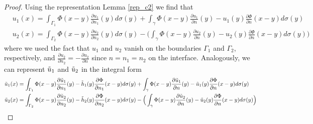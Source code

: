 \begin{proof}
    Using the representation Lemma \ref{rep_c2} we find that
    \begin{align*}
        &u_1(x) = \int_{\Gamma_1} \Phi(x-y)\frac{\partial u_1}{\partial n_1}(y) d\sigma(y)+\int_{\gamma} \Phi(x-y)\frac{\partial u_1}{\partial n}(y) - u_1(y) \frac{\partial \Phi}{\partial n}(x-y) d\sigma(y)\\
        &u_2(x) = \int_{\Gamma_2} \Phi(x-y)\frac{\partial u_2}{\partial n_2}(y) d\sigma(y)-\Big(\int_{\gamma} \Phi(x-y)\frac{\partial u_2}{\partial n}(y) - u_2(y) \frac{\partial \Phi}{\partial n}(x-y) d\sigma(y)\Big)
    \end{align*}
    where we used the fact that \(u_1\) and \(u_2\) vanish on the boundaries \(\Gamma_1\) and \(\Gamma_2\), respectively, and \(\frac{\partial u_2}{\partial n_2} = -\frac{\partial u_2}{\partial n}\) since \(n = n_1 = n_2\) on the interface.
    Analogously, we can represent \(\Tilde{u}_1\) and \(\Tilde{u}_2\) in the integral form
    \begin{align*}
        &\Tilde{u}_1(x) =  \int_{\Gamma_1} \Phi(x-y)\frac{\partial \Tilde{u}_1}{\partial n_1}(y) - \Tilde{h}_1(y) \frac{\partial \Phi}{\partial n_1}(x-y) d\sigma(y) + \int_{\gamma} \Phi(x-y)\frac{\partial \Tilde{u}_1}{\partial n}(y) - \Tilde{u}_1(y) \frac{\partial \Phi}{\partial n}(x-y) d\sigma(y)\\
        &\Tilde{u}_2(x) = \int_{\Gamma_2} \Phi(x-y)\frac{\partial \Tilde{u}_2}{\partial n_2}(y) - \Tilde{h}_2(y) \frac{\partial \Phi}{\partial n_2}(x-y) d\sigma(y) -\Big(\int_{\gamma} \Phi(x-y)\frac{\partial \Tilde{u}_2}{\partial n}(y) - \Tilde{u}_2(y) \frac{\partial \Phi}{\partial n}(x-y) d\sigma(y)\Big)
    \end{align*}


\end{proof}
